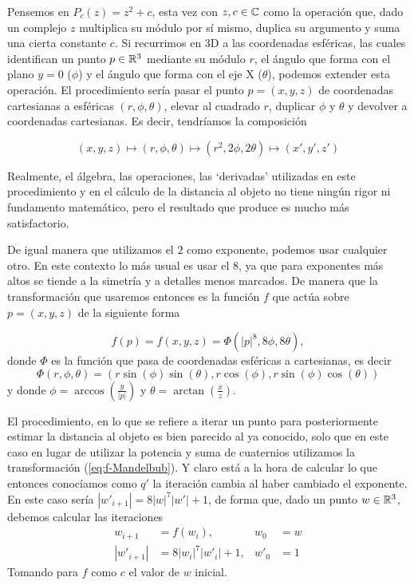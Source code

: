 Pensemos en $P_c(z)=z^2+c$, esta vez con $z,c\in\mathbb{C}$ como la operación que, dado un complejo $z$ multiplica su módulo por sí mismo, duplica su argumento y suma una cierta constante $c$. Si recurrimos en 3D a las coordenadas esféricas, las cuales identifican un punto $p\in\mathbb{R}^3$ mediante su módulo $r$, el ángulo que forma con el plano $y=0$ ($\phi$) y el ángulo que forma con el eje X ($\theta$), podemos extender esta operación. El procedimiento sería pasar el punto $p=(x,y,z)$ de coordenadas cartesianas a esféricas $(r,\phi,\theta)$, elevar al cuadrado $r$, duplicar $\phi$ y $\theta$ y devolver a coordenadas cartesianas. Es decir, tendríamos la composición 

$$
(x,y,z)\longmapsto(r,\phi,\theta)\longmapsto(r^2,2\phi,2\theta)\longmapsto(x',y',z')
$$

Realmente, el álgebra, las operaciones, las `derivadas' utilizadas en este procedimiento y en el cálculo de la distancia al objeto no tiene ningún rigor ni fundamento matemático, pero el resultado que produce es mucho más satisfactorio.

De igual manera que utilizamos el $2$ como exponente, podemos usar cualquier otro. En este contexto lo más usual es usar el 8, ya que para exponentes más altos se tiende a la simetría y a detalles menos marcados. De manera que la transformación que usaremos entonces es la función $f$ que actúa sobre $p=(x,y,z)$ de la siguiente forma

\begin{equation}
    \label{eq:f-Mandelbub}
    f(p)=f(x,y,z) = \Phi(|p|^8,8\phi, 8\theta),
\end{equation}
donde $\Phi$ es la función que pasa de coordenadas esféricas a cartesianas, es decir
$$
\Phi(r,\phi,\theta) = (r\sin(\phi)\sin(\theta),r\cos(\phi),r\sin(\phi)\cos(\theta))
$$
y donde $\phi = \arccos(\frac{y}{|p|})$ y $\theta=\arctan(\frac{x}{z})$.

El procedimiento, en lo que se refiere a iterar un punto para posteriormente estimar la distancia al objeto es bien parecido al ya conocido, solo que en este caso en lugar de utilizar la potencia y suma de cuaternios utilizamos la transformación (\ref{eq:f-Mandelbub}). Y claro está a la hora de calcular lo que entonces conocíamos como $q'$ la iteración cambia al haber cambiado el exponente. En este caso sería $|w'_{i+1}|=8|w|^7|w'|+1$, de forma que, dado un punto $w\in\mathbb{R}^3$, debemos calcular las iteraciones 
\begin{align*}
    w_{i+1} &= f(w_i), & w_0&=w \\
    |w'_{i+1}| &= 8|w_i|^7|w'_i|+1, & w'_0&=1
\end{align*}
Tomando para $f$ como $c$ el valor de $w$ inicial.

